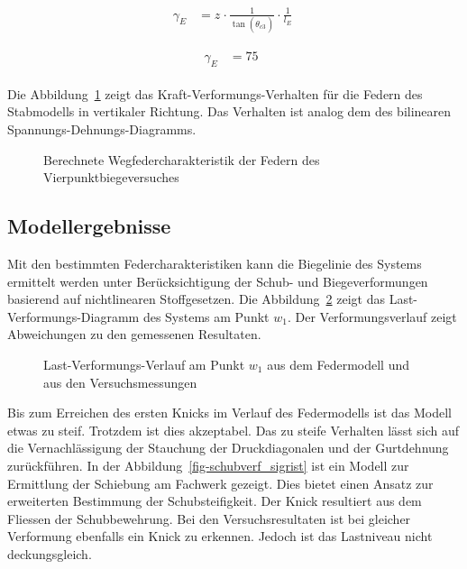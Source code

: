 \documentclass[
  11pt,
  letterpaper,
]{scrreprt}
\begin{document}
$$
\begin{aligned}
\gamma_{E_{_{}}} &= z_{_{}} \cdot \frac{ 1 }{ \tan \left( \theta_{c3_{_{}}} \right) } \cdot \frac{1} { l_{E} } \; 
\end{aligned}
$$

$$
\begin{aligned}
\gamma_{E_{_{}}} &= 75\ \;
\end{aligned}
$$

Die Abbildung~\ref{fig-wegfeder-schub-sv14} zeigt das
Kraft-Verformungs-Verhalten für die Federn des Stabmodells in vertikaler
Richtung. Das Verhalten ist analog dem des bilinearen
Spannungs-Dehnungs-Diagramms.

\begin{figure}[H]


\caption{\label{fig-wegfeder-schub-sv14}Berechnete
Wegfedercharakteristik der Federn des Vierpunktbiegeversuches}

\end{figure}%

\subsection{Modellergebnisse}\label{modellergebnisse-1}

Mit den bestimmten Federcharakteristiken kann die Biegelinie des Systems
ermittelt werden unter Berücksichtigung der Schub- und Biegeverformungen
basierend auf nichtlinearen Stoffgesetzen. Die
Abbildung~\ref{fig-l-w-sv14} zeigt das Last-Verformungs-Diagramm des
Systems am Punkt \(w_1\). Der Verformungsverlauf zeigt Abweichungen zu
den gemessenen Resultaten.

\begin{figure}[H]


\caption{\label{fig-l-w-sv14}Last-Verformungs-Verlauf am Punkt \(w_1\)
aus dem Federmodell und aus den Versuchsmessungen}

\end{figure}%

Bis zum Erreichen des ersten Knicks im Verlauf des Federmodells ist das
Modell etwas zu steif. Trotzdem ist dies akzeptabel. Das zu steife
Verhalten lässt sich auf die Vernachlässigung der Stauchung der
Druckdiagonalen und der Gurtdehnung zurückführen. In der
Abbildung~\ref{fig-schubverf_sigrist} ist ein Modell zur Ermittlung der
Schiebung am Fachwerk gezeigt. Dies bietet einen Ansatz zur erweiterten
Bestimmung der Schubsteifigkeit. Der Knick resultiert aus dem Fliessen
der Schubbewehrung. Bei den Versuchsresultaten ist bei gleicher
Verformung ebenfalls ein Knick zu erkennen. Jedoch ist das Lastniveau
nicht deckungsgleich.
\end{document}
